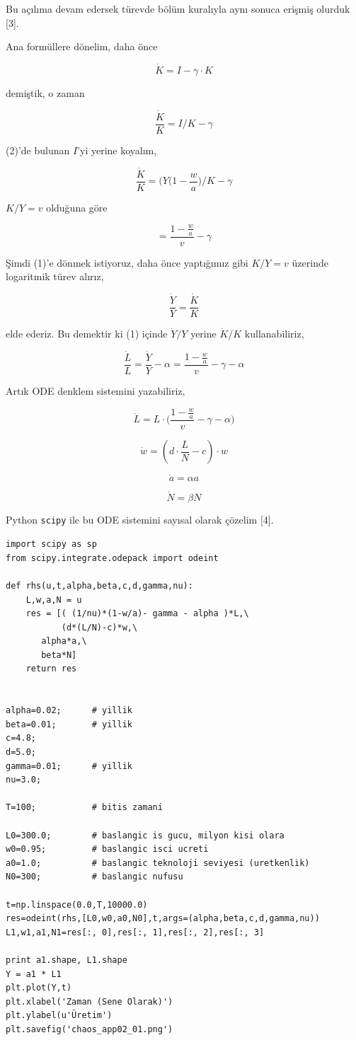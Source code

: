 \documentclass[12pt,fleqn]{article}\usepackage{../../common}
\begin{document}
Bu açılıma devam edersek türevde bölüm kuralıyla aynı sonuca erişmiş
olurduk [3]. 

Ana formüllere dönelim, daha önce

$$ \dot{K} = I-\gamma \cdot K$$

demiştik, o zaman 

$$ \frac{\dot{K}}{K} = I/K - \gamma$$

(2)'de bulunan $I$'yi yerine koyalım,

$$ \frac{\dot{K}}{K} = \big(Y(1 - \frac{w}{a} \big) / K - \gamma$$

$K/Y = v$ olduğuna göre

$$ = \frac{1-\frac{w}{a}}{v} - \gamma$$

Şimdi (1)'e dönmek istiyoruz, daha önce yaptığımız gibi $K/Y = v$ üzerinde
logaritmik türev alırız,

$$ 
\frac{\dot{Y}}{Y} = \frac{\dot{K}}{K} 
$$

elde ederiz. Bu demektir ki (1) içinde $\dot{Y}/Y$ yerine $\dot{K}/K$
kullanabiliriz,

$$ 
\frac{\dot{L}}{L} = \frac{\dot{Y}}{Y} - \alpha =  \frac{1-\frac{w}{a}}{v} -
\gamma - \alpha
$$

Artık ODE denklem sistemini yazabiliriz,

$$ 
\dot{L} = L \cdot \bigg( \frac{1-\frac{w}{a}}{v} - \gamma - \alpha \bigg)
$$

$$ \dot{w} = (d \cdot \frac{L}{N} - c) \cdot w $$

$$ \dot{a} = \alpha a$$

$$ \dot{N} = \beta N$$

Python \verb!scipy! ile bu ODE sistemini sayısal olarak çözelim [4]. 

\begin{verbatim}
import scipy as sp
from scipy.integrate.odepack import odeint

def rhs(u,t,alpha,beta,c,d,gamma,nu):
    L,w,a,N = u
    res = [( (1/nu)*(1-w/a)- gamma - alpha )*L,\
    	   (d*(L/N)-c)*w,\
	   alpha*a,\
	   beta*N]
    return res
    

alpha=0.02;      # yillik
beta=0.01;       # yillik
c=4.8;
d=5.0;
gamma=0.01;      # yillik
nu=3.0;

T=100;           # bitis zamani

L0=300.0;        # baslangic is gucu, milyon kisi olara
w0=0.95;         # baslangic isci ucreti
a0=1.0;          # baslangic teknoloji seviyesi (uretkenlik)
N0=300;          # baslangic nufusu

t=np.linspace(0.0,T,10000.0)
res=odeint(rhs,[L0,w0,a0,N0],t,args=(alpha,beta,c,d,gamma,nu))
L1,w1,a1,N1=res[:, 0],res[:, 1],res[:, 2],res[:, 3]

print a1.shape, L1.shape
Y = a1 * L1
plt.plot(Y,t)
plt.xlabel('Zaman (Sene Olarak)')
plt.ylabel(u'Üretim')
plt.savefig('chaos_app02_01.png')
\end{verbatim}
\end{document}
